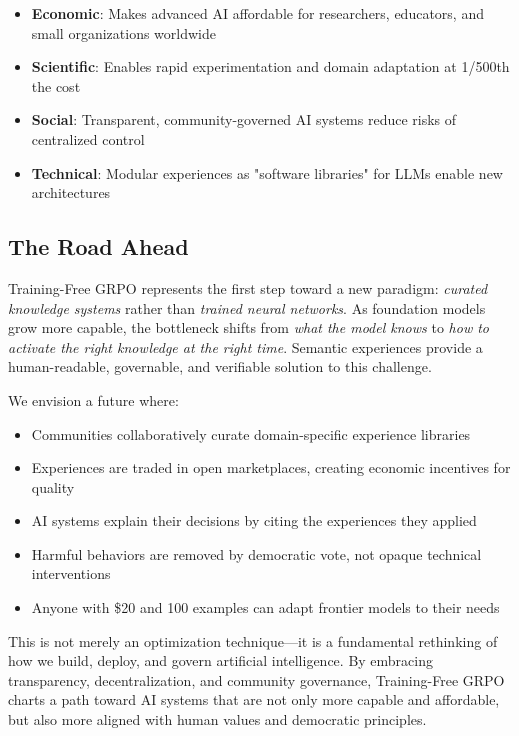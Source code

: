 \begin{itemize}
    \item \textbf{Economic}: Makes advanced AI affordable for researchers, educators, and small organizations worldwide

    \item \textbf{Scientific}: Enables rapid experimentation and domain adaptation at 1/500th the cost

    \item \textbf{Social}: Transparent, community-governed AI systems reduce risks of centralized control

    \item \textbf{Technical}: Modular experiences as "software libraries" for LLMs enable new architectures
\end{itemize}

\subsection{The Road Ahead}

Training-Free GRPO represents the first step toward a new paradigm: \textit{curated knowledge systems} rather than \textit{trained neural networks}. As foundation models grow more capable, the bottleneck shifts from \textit{what the model knows} to \textit{how to activate the right knowledge at the right time}. Semantic experiences provide a human-readable, governable, and verifiable solution to this challenge.

We envision a future where:
\begin{itemize}
    \item Communities collaboratively curate domain-specific experience libraries
    \item Experiences are traded in open marketplaces, creating economic incentives for quality
    \item AI systems explain their decisions by citing the experiences they applied
    \item Harmful behaviors are removed by democratic vote, not opaque technical interventions
    \item Anyone with \$20 and 100 examples can adapt frontier models to their needs
\end{itemize}

This is not merely an optimization technique—it is a fundamental rethinking of how we build, deploy, and govern artificial intelligence. By embracing transparency, decentralization, and community governance, Training-Free GRPO charts a path toward AI systems that are not only more capable and affordable, but also more aligned with human values and democratic principles.

